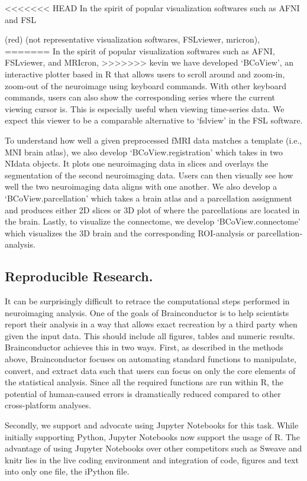 \documentclass{nature}
\begin{document}
<<<<<<< HEAD
In the spirit of popular visualization softwares such as AFNI and FSL
{\color(red) (not representative visualization softwares, FSLviewer, mricron), 
=======
In the spirit of popular visualization softwares such as AFNI, FSLviewer, and MRIcron, 
>>>>>>> kevin
we have developed `BCoView', an interactive plotter based in R that allows users to
scroll around and
zoom-in, zoom-out of the neuroimage using keyboard commands. With other keyboard
commands, users can also show the corresponding series where the current
viewing
cursor is. This is especially useful when viewing time-series data. 
We expect this viewer to be a comparable alternative to `fslview' in
the FSL
software.

To understand how well a given preprocessed fMRI data matches a template (i.e.,
MNI brain
atlas), we also develop `BCoView.registration' which takes in two NIdata
objects.
It plots one neuroimaging data in slices and overlays the segmentation of the
second
neuroimaging data. Users can then visually see how well the two neuroimaging
data aligns
with one another. We also develop a `BCoView.parcellation' which takes a brain
atlas and
a parcellation assignment and produces either 2D slices or 3D plot of where the
parcellations
are located in the brain.
Lastly, to visualize the connectome, we develop `BCoView.connectome' which
visualizes the
3D brain and the corresponding ROI-analysis or parcellation-analysis.


\subsection{Reproducible Research.}

It can be surprisingly difficult to retrace the computational steps performed
in neuroimaging analysis. One of the goals of Brainconductor is to help
scientists report their analysis in a way that allows exact recreation by
a third party when given the input data. This should include all figures,
tables and numeric results. Brainconductor achieves this in two ways.
First, as described in the methods above, Brainconductor focuses on automating
standard functions to manipulate, convert, and extract data such that users
can focus on only the core elements of the statistical analysis. Since all the
required functions are run within R, the potential of human-caused errors is
dramatically reduced compared to other cross-platform analyses.

Secondly, we support and advocate using Jupyter Notebooks for
this task. While initially supporting Python, Jupyter Notebooks now support
the usage of R. The advantage of using Jupyter Notebooks over other competitors
such as Sweave and knitr lies in the live coding environment and
integration of code, figures and text into only one file, the iPython file.

}
\end{document}
